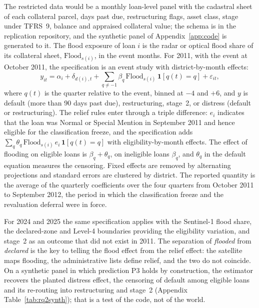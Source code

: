 The restricted data would be a monthly loan-level panel with the cadastral sheet of each collateral parcel, days past due, restructuring flags, asset class, stage under TFRS~9, balance and appraised collateral value; the schema is in the replication repository, and the synthetic panel of Appendix~\ref{app:code} is generated to it. The flood exposure of loan $i$ is the radar or optical flood share of its collateral sheet, $\mathrm{Flood}_{s(i)}$, in the event months. For 2011, with the event at October 2011, the specification is an event study with district-by-month effects:
\begin{equation}
y_{it} = \alpha_i + \delta_{d(i),t} + \sum_{q \neq -1} \beta_q\,\mathrm{Flood}_{s(i)}\,\mathbf{1}[q(t) = q] + \varepsilon_{it},
\label{eq:es}
\end{equation}
where $q(t)$ is the quarter relative to the event, binned at $-4$ and $+6$, and $y$ is default (more than 90 days past due), restructuring, stage~2, or distress (default or restructuring). The relief rules enter through a triple difference: $e_i$ indicates that the loan was Normal or Special Mention in September 2011 and hence eligible for the classification freeze, and the specification adds $\sum_q \theta_q\,\mathrm{Flood}_{s(i)}\,e_i\,\mathbf{1}[q(t)=q]$ with eligibility-by-month effects. The effect of flooding on eligible loans is $\beta_q + \theta_q$, on ineligible loans $\beta_q$, and $\theta_q$ in the default equation measures the censoring. Fixed effects are removed by alternating projections and standard errors are clustered by district. The reported quantity is the average of the quarterly coefficients over the four quarters from October 2011 to September 2012, the period in which the classification freeze and the revaluation deferral were in force.

For 2024 and 2025 the same specification applies with the Sentinel-1 flood share, the declared-zone and Level-4 boundaries providing the eligibility variation, and stage~2 as an outcome that did not exist in 2011. The separation of \emph{flooded} from \emph{declared} is the key to telling the flood effect from the relief effect: the satellite maps flooding, the administrative lists define relief, and the two do not coincide. On a synthetic panel in which prediction P3 holds by construction, the estimator recovers the planted distress effect, the censoring of default among eligible loans and its re-routing into restructuring and stage~2 (Appendix Table~\ref{tab:rq2synth}); that is a test of the code, not of the world.

